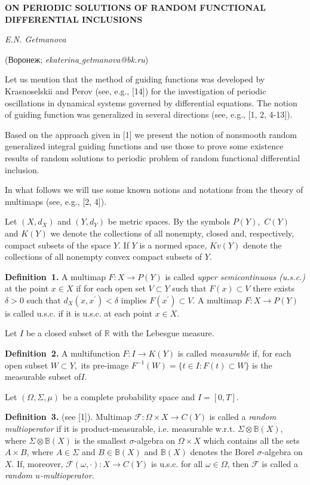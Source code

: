 \begin{center}
    {\bf ON PERIODIC SOLUTIONS OF RANDOM FUNCTIONAL DIFFERENTIAL INCLUSIONS}

    {\it E.N. Getmanova}

    (Воронеж; {\it ekaterina$\_$getmanova@bk.ru})
\end{center}



Let us mention that the method of guiding functions was developed by Krasnoselskii and Perov (see, e.g., [14]) for the investigation of periodic oscillations in dynamical systems go\-ver\-ned by differential equations. The notion of guiding function was generalized in several directions (see, e.g., [1, 2, 4-13]).

Based on the approach given in [1] we present the notion of nonsmooth random generalized integral guiding functions and use those to prove some existence results of random solutions to periodic problem of random functional differential inclusion.

In what follows we will use some known notions and notati\-ons from the theory of multimaps (see, e.g., [2, 4]).

Let $(X,d_X)$ and $(Y,d_Y)$ be metric spaces. By the symbols $P(Y),$ $C(Y)$ and $K(Y)$ we denote the collections of all nonemp\-ty, closed and, respectively, compact subsets of the space $Y.$ If $Y$ is a normed space, $Kv(Y)$ denote the collections of all nonempty convex compact subsets of $Y.$

\textbf{Definition~1.}
A multimap $F:X \to P(Y)$ is called {\it upper semicontinuous (u.s.c.)} at the point $x\in X$ if for each open set $V \subset Y$ such that $F(x) \subset V$ there exists $\delta >0$ such that $d_X(x,x^\prime)<\delta$ implies $F(x^\prime)\subset V.$ A multimap $F:X \to P(Y)$ is called u.s.c. if it is u.s.c. at each point $x\in X.$

Let $I$ be a closed subset of $\mathbb{R}$ with the Lebesgue measure.

\textbf{Definition~2.}
A multifunction $F:I \to K(Y)$ is called {\it measurable} if, for each open subset $W \subset Y,$ its pre-image \linebreak
$F^{-1}(W)=\{t\in I:F(t)\subset W\}$ is the measurable subset of$I.$

Let $(\Omega,\Sigma,\mu)$ be a complete probability space and $I=[0,T]$.

\textbf{Definition~3.} (see [1]). Multimap $\mathcal{F}\colon\Omega\times X\to C(Y)$ is called a {\it random multioperator} if it is product-measurable, i.e. measurable w.r.t. $\Sigma\otimes\mathbb{B}(X)$, where $\Sigma\otimes\mathbb{B}(X)$ is the smallest
$\sigma$-algebra on $\Omega\times X$ which contains all the sets $A\times B$, where $A\in\Sigma$ and $B\in\mathbb{B}(X)$ and
$\mathbb{B}(X)$ denotes the Borel $\sigma$-algebra on $X$. If, moreover, $\mathcal{F}(\omega,\cdot)\colon X\to C(Y)$ is u.s.c. for all
$\omega\in\Omega$, then $\mathcal{F}$ is called a {\it random $u$-multioperator}.

